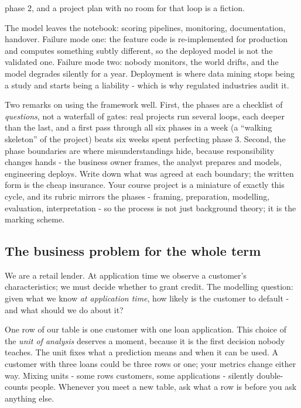 \documentclass[11pt,a4paper]{article}
\begin{document}
\begin{description}[leftmargin=1.4em,style=nextline,itemsep=3pt]
        phase 2, and a project plan with no room for that loop is a
        fiction.
  \item[6. Deployment.] The model leaves the notebook: scoring pipelines,
        monitoring, documentation, handover. Failure mode one: the feature
        code is re-implemented for production and computes something
        subtly different, so the deployed model is not the validated one.
        Failure mode two: nobody monitors, the world drifts, and the model
        degrades silently for a year. Deployment is where data mining
        stops being a study and starts being a liability - which is why
        regulated industries audit it.
\end{description}

Two remarks on using the framework well. First, the phases are a checklist
of \emph{questions}, not a waterfall of gates: real projects run several
loops, each deeper than the last, and a first pass through all six phases
in a week (a ``walking skeleton'' of the project) beats six weeks spent
perfecting phase 3. Second, the phase boundaries are where
misunderstandings hide, because responsibility changes hands - the
business owner frames, the analyst prepares and models, engineering
deploys. Write down what was agreed at each boundary; the written form is
the cheap insurance. Your course project is a miniature of exactly this
cycle, and its rubric mirrors the phases - framing, preparation,
modelling, evaluation, interpretation - so the process is not just
background theory; it is the marking scheme.

\subsection{The business problem for the whole term}
We are a retail lender. At application time we observe a customer's
characteristics; we must decide whether to grant credit. The modelling
question: given what we know \emph{at application time}, how likely is the
customer to default - and what should we do about it?

One row of our table is one customer with one loan application. This choice
of the \emph{unit of analysis} deserves a moment, because it is the first
decision nobody teaches. The unit fixes what a prediction means and when it
can be used. A customer with three loans could be three rows or one; your
metrics change either way. Mixing units - some rows customers, some
applications - silently double-counts people. Whenever you meet a new
table, ask what a row is before you ask anything else.
\end{document}
